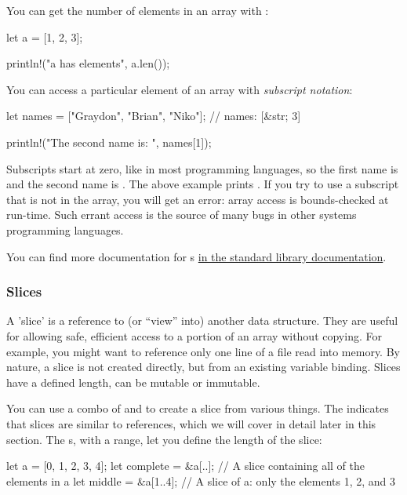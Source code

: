 You can get the number of elements in an array  with :

\begin{rustc}
let a = [1, 2, 3];

println!("a has {} elements", a.len());
\end{rustc}

You can access a particular element of an array with \emph{subscript notation}:

\begin{rustc}
let names = ["Graydon", "Brian", "Niko"]; // names: [&str; 3]

println!("The second name is: {}", names[1]);
\end{rustc}

Subscripts start at zero, like in most programming languages, so the first name is  and the second name is .
The above example prints . If you try to use a subscript that is not in the array, you will get an error:
array access is bounds-checked at run-time. Such errant access is the source of many bugs in other systems programming languages.

\blank

You can find more documentation for s \href{https://doc.rust-lang.org/std/primitive.array.html}{in the standard library
documentation}.

\subsubsection*{Slices}

A 'slice' is a reference to (or “view” into) another data structure. They are useful for allowing safe, efficient access to a portion 
of an array without copying. For example, you might want to reference only one line of a file read into memory. By nature, a slice is 
not created directly, but from an existing variable binding. Slices have a defined length, can be mutable or immutable.


You can use a combo of \code{\&} and \code{[]} to create a slice from various things. The \code{\&} indicates that slices are similar 
to references, which we will cover in detail later in this section. The \code{[]}s, with a range, let you define the length of the slice:

\begin{rustc}
let a = [0, 1, 2, 3, 4];
let complete = &a[..]; // A slice containing all of the elements in a
let middle = &a[1..4]; // A slice of a: only the elements 1, 2, and 3
\end{rustc}

